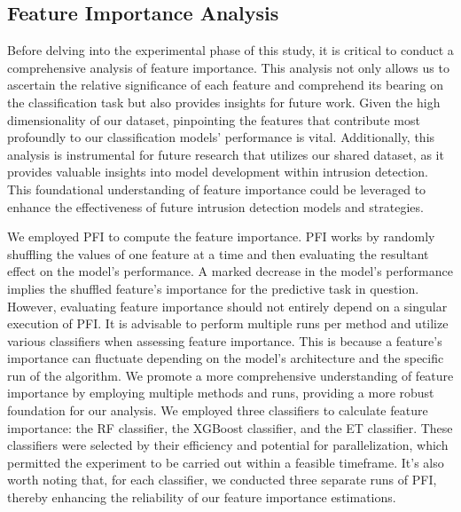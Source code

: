 \documentclass[lettersize,journal]{IEEEtran}
\begin{document}
\subsection{Feature Importance Analysis}\label{sec:feat_imp}
Before delving into the experimental phase of this study, it is critical to conduct a comprehensive analysis of feature importance. This analysis not only allows us to ascertain the relative significance of each feature and comprehend its bearing on the classification task but also provides insights for future work. Given the high dimensionality of our dataset, pinpointing the features that contribute most profoundly to our classification models' performance is vital. Additionally, this analysis is instrumental for future research that utilizes our shared dataset, as it provides valuable insights into model development within intrusion detection. This foundational understanding of feature importance could be leveraged to enhance the effectiveness of future intrusion detection models and strategies.  
 
We employed \ac{PFI} to compute the feature importance. \ac{PFI} works by randomly shuffling the values of one feature at a time and then evaluating the resultant effect on the model's performance. A marked decrease in the model's performance implies the shuffled feature's importance for the predictive task in question. However, evaluating feature importance should not entirely depend on a singular execution of \ac{PFI}. It is advisable to perform multiple runs per method and utilize various classifiers when assessing feature importance. This is because a feature's importance can fluctuate depending on the model's architecture and the specific run of the algorithm. We promote a more comprehensive understanding of feature importance by employing multiple methods and runs, providing a more robust foundation for our analysis. We employed three classifiers to calculate feature importance: the \ac{RF} classifier, the \ac{XGBoost} classifier, and the \ac{ET} classifier. These classifiers were selected by their efficiency and potential for parallelization, which permitted the experiment to be carried out within a feasible timeframe. It's also worth noting that, for each classifier, we conducted three separate runs of \ac{PFI}, thereby enhancing the reliability of our feature importance estimations.
\end{document}

